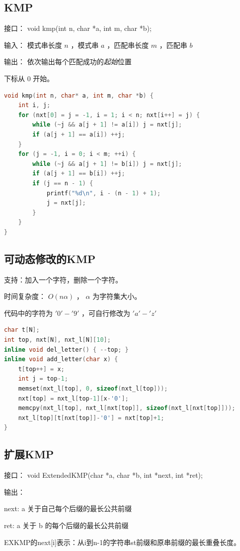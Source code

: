 \documentclass{article}
\begin{document}
\subsection{KMP}
接口： void kmp(int n, char *a, int m, char *b); 

输入： 模式串长度 $n$ ，模式串 $a$ ，匹配串长度 $m$ ，匹配串 $b$

输出： 依次输出每个匹配成功的\emph{起始}位置

下标从 $0$ 开始。

\begin{lstlisting}[language=C++]
void kmp(int n, char* a, int m, char *b) {
    int i, j;
    for (nxt[0] = j = -1, i = 1; i < n; nxt[i++] = j) {
        while (~j && a[j + 1] != a[i]) j = nxt[j];
        if (a[j + 1] == a[i]) ++j;
    }
    for (j = -1, i = 0; i < m; ++i) {
        while (~j && a[j + 1] != b[i]) j = nxt[j];
        if (a[j + 1] == b[i]) ++j;
        if (j == n - 1) {
            printf("%d\n", i - (n - 1) + 1);
            j = nxt[j];
        }
    }
}
\end{lstlisting}
\subsection{可动态修改的KMP}
支持：加入一个字符，删除一个字符。

时间复杂度： $O(n \alpha)$ ， $\alpha$ 为字符集大小。

代码中的字符为 $'0' - '9'$ ，可自行修改为 $'a' - 'z'$
\begin{lstlisting}[language=C++]
char t[N];
int top, nxt[N], nxt_l[N][10];
inline void del_letter() { --top; }
inline void add_letter(char x) {
	t[top++] = x;
	int j = top-1;
	memset(nxt_l[top], 0, sizeof(nxt_l[top]));
	nxt[top] = nxt_l[top-1][x-'0'];
	memcpy(nxt_l[top], nxt_l[nxt[top]], sizeof(nxt_l[nxt[top]]));
	nxt_l[top][t[nxt[top]]-'0'] = nxt[top]+1;
}
\end{lstlisting}
\subsection{扩展KMP}
接口： void ExtendedKMP(char *a, char *b, int *next, int *ret); 

输出： 

next:  a 关于自己每个后缀的最长公共前缀 

ret: a 关于 b 的每个后缀的最长公共前缀


EXKMP的next[i]表示：从i到n-1的字符串st前缀和原串前缀的最长重叠长度。
\end{document}

